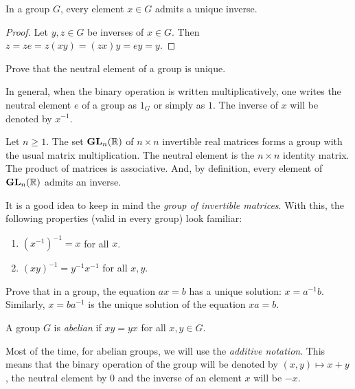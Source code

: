\begin{proposition}
    In a group $G$, every element $x\in G$ admits a unique inverse.
\end{proposition}

\begin{proof}
    Let $y,z\in G$ be inverses of $x\in G$. Then 
    $z=ze=z(xy)=(zx)y=ey=y$.
\end{proof}

\begin{exercise}
\label{xca:neutral}
    Prove that the neutral element of a group is unique. 
\end{exercise}

In general, when the binary operation is written multiplicatively, one writes
the neutral element $e$ of a group as $1_G$ or simply as $1$. The inverse of
$x$ will be denoted by $x^{-1}$. 

\begin{example}
    Let $n\geq1$. The set $\mathbf{GL}_n(\mathbb{R})$ of $n\times n$ invertible real 
matrices forms a
    group with the usual matrix multiplication. The neutral element is the $n\times n$ 
    identity matrix. The product 
    of matrices is associative. And, by definition, every element of $\mathbf{GL}_n(\mathbb{R})$ admits an inverse. 
\end{example}

It is a good idea to keep in mind the \emph{group of invertible matrices}. 
With this, the following properties (valid in every group) look familiar:
\begin{enumerate}
    \item $(x^{-1})^{-1}=x$ for all $x$.
    \item $(xy)^{-1}=y^{-1}x^{-1}$ for all $x,y$. 
\end{enumerate}

\begin{exercise}
\label{xca:ax=b}
    Prove that in a group, the equation $ax=b$ has 
    a unique solution: $x=a^{-1}b$. Similarly, 
    $x=ba^{-1}$ is the unique solution of the equation
    $xa=b$. 
\end{exercise}

\begin{definition}
    A group $G$ is \emph{abelian} if $xy=yx$ for all $x,y\in G$. 
\end{definition}

Most of the time, for abelian groups, we will use 
the \emph{additive notation}. This means that the binary operation
of the group will be denoted by $(x,y)\mapsto x+y$, the neutral
element by $0$ and 
the inverse of an element $x$ will be $-x$. 


